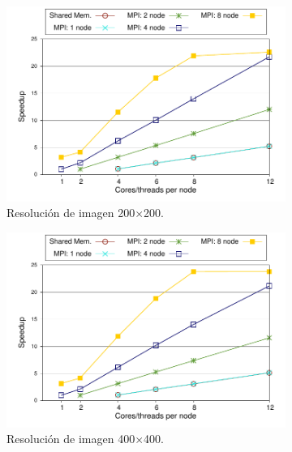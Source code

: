 \vspace{0.35cm}
\begin{figure}[!tbp]
\centering
\begin{subfigure}[b]{0.32\textwidth}
  \centering
  \includegraphics[width=0.95\linewidth]{figures/graph-mpi-200-pffp.pdf}
  \caption{Resolución de imagen 200$\times$200.}
  \label{fig:mandel-pffp-200}
\end{subfigure}%
\hfill
\begin{subfigure}[b]{0.32\textwidth}
  \centering
  \includegraphics[width=0.95\linewidth]{figures/graph-mpi-400-pffp.pdf}
  \caption{Resolución de imagen 400$\times$400.}
  \label{fig:mandel-pffp-400}
\end{subfigure}
\hfill
\begin{subfigure}[b]{0.32\textwidth}
  \centering

\end{subfigure}
\end{figure}
